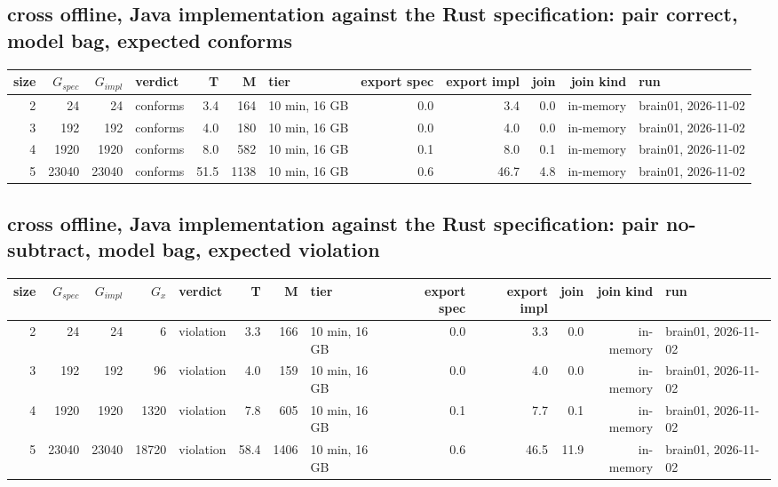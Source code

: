 \documentclass[10pt]{article}
\begin{document}
\subsection*{cross offline, Java implementation against the Rust specification: pair \textsf{correct}, model bag, expected conforms}
\begin{longtable}{@{}rrrlrrlrrrrl@{}}
\toprule
size & $G_{\mathit{spec}}$ & $G_{\mathit{impl}}$ & verdict & T & M & tier & export spec & export impl & join & join kind & run \\
\midrule
\endhead
\color{red} 2 & 24 & 24 & conforms & 3.4 & 164 & 10 min, 16 GB & 0.0 & 3.4 & 0.0 & in-memory & brain01, 2026-11-02 \\
\color{red} 3 & 192 & 192 & conforms & 4.0 & 180 & 10 min, 16 GB & 0.0 & 4.0 & 0.0 & in-memory & brain01, 2026-11-02 \\
\color{red} 4 & 1920 & 1920 & conforms & 8.0 & 582 & 10 min, 16 GB & 0.1 & 8.0 & 0.1 & in-memory & brain01, 2026-11-02 \\
\color{red} 5 & 23040 & 23040 & conforms & 51.5 & 1138 & 10 min, 16 GB & 0.6 & 46.7 & 4.8 & in-memory & brain01, 2026-11-02 \\
\bottomrule
\end{longtable}
\subsection*{cross offline, Java implementation against the Rust specification: pair \textsf{no-subtract}, model bag, expected violation}
\begin{longtable}{@{}rrrrlrrlrrrrl@{}}
\toprule
size & $G_{\mathit{spec}}$ & $G_{\mathit{impl}}$ & $G_x$ & verdict & T & M & tier & export spec & export impl & join & join kind & run \\
\midrule
\endhead
\color{red} 2 & 24 & 24 & 6 & violation & 3.3 & 166 & 10 min, 16 GB & 0.0 & 3.3 & 0.0 & in-memory & brain01, 2026-11-02 \\
\color{red} 3 & 192 & 192 & 96 & violation & 4.0 & 159 & 10 min, 16 GB & 0.0 & 4.0 & 0.0 & in-memory & brain01, 2026-11-02 \\
\color{red} 4 & 1920 & 1920 & 1320 & violation & 7.8 & 605 & 10 min, 16 GB & 0.1 & 7.7 & 0.1 & in-memory & brain01, 2026-11-02 \\
\color{red} 5 & 23040 & 23040 & 18720 & violation & 58.4 & 1406 & 10 min, 16 GB & 0.6 & 46.5 & 11.9 & in-memory & brain01, 2026-11-02 \\
\bottomrule
\end{longtable}
\end{document}
